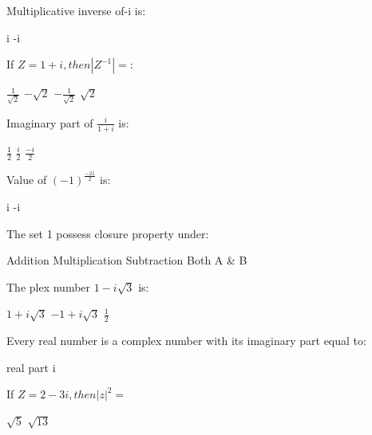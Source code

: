 \documentclass{exam}
\begin{document}
\begin{questions}
Multiplicative inverse of-i is:\\
\begin{oneparchoices}
\choice i
\choice -i
\end{oneparchoices}
\question 

If \(Z = 1+i ,then \left| Z^{-1} \right| =:\)\\
\begin{oneparchoices}
\choice \(\frac{1}{\sqrt{2}}\)
\choice \(-{\sqrt{2}}\)
\choice \(-\frac{1}{\sqrt{2}}\)
\choice \({\sqrt{2}}\)
\end{oneparchoices}
\question 

Imaginary part of \(\frac{i}{1+i}\) is:\\
\begin{oneparchoices}
\choice \(\frac{1}{2}\)
\choice \(\frac{i}{2}\)
\choice \(\frac{-i}{2}\)
\end{oneparchoices}
\question 

Value of \( (-1)^{\frac{-21}{2}}\) is:\\
\begin{oneparchoices}
\choice i
\choice -i
\end{oneparchoices}
\question 

The set {1} possess closure property under:\\
\begin{oneparchoices}
\choice Addition
\choice Multiplication
\choice Subtraction
\choice Both A \& B
\end{oneparchoices}
\question 

The plex number \(1-i\sqrt{3}\) is:\\
\begin{oneparchoices}
\choice \(1+i\sqrt{3}\)
\choice \(-1+i\sqrt{3}\)
\choice \(\frac{1}{2}\)
\end{oneparchoices}
\question 

Every real number is a complex number with its imaginary part equal to:\\
\begin{oneparchoices}
\choice real part
\choice i
\end{oneparchoices}
\question 

If \( Z = 2-3i, then \left| z \right|^{2}= \)\\
\begin{oneparchoices}
\choice \(\sqrt{5}\)
\choice \(\sqrt{13}\)
\end{oneparchoices}
\question 


\end{questions}
\end{document}
